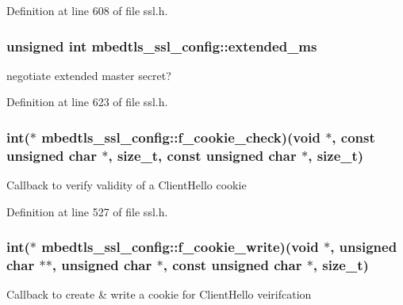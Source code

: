 Definition at line 608 of file ssl.\-h.

\hypertarget{structmbedtls__ssl__config_ac6ac2c30ac20fc9033913e0de6ffbe93}{
\subsubsection[{extended\-\_\-ms}]{\setlength{\rightskip}{0pt plus 5cm}unsigned int mbedtls\-\_\-ssl\-\_\-config\-::extended\-\_\-ms}}\label{structmbedtls__ssl__config_ac6ac2c30ac20fc9033913e0de6ffbe93}
negotiate extended master secret? 

Definition at line 623 of file ssl.\-h.

\hypertarget{structmbedtls__ssl__config_a2a992d43e5f3215b07533dd6cacf5de4}{
\subsubsection[{f\-\_\-cookie\-\_\-check}]{\setlength{\rightskip}{0pt plus 5cm}int($\ast$ mbedtls\-\_\-ssl\-\_\-config\-::f\-\_\-cookie\-\_\-check)(void $\ast$, const unsigned char $\ast$, size\-\_\-t, const unsigned char $\ast$, size\-\_\-t)}}\label{structmbedtls__ssl__config_a2a992d43e5f3215b07533dd6cacf5de4}
Callback to verify validity of a Client\-Hello cookie 

Definition at line 527 of file ssl.\-h.

\hypertarget{structmbedtls__ssl__config_a24ad512d14251faef692f9692acab21c}{
\subsubsection[{f\-\_\-cookie\-\_\-write}]{\setlength{\rightskip}{0pt plus 5cm}int($\ast$ mbedtls\-\_\-ssl\-\_\-config\-::f\-\_\-cookie\-\_\-write)(void $\ast$, unsigned char $\ast$$\ast$, unsigned char $\ast$, const unsigned char $\ast$, size\-\_\-t)}}\label{structmbedtls__ssl__config_a24ad512d14251faef692f9692acab21c}
Callback to create \& write a cookie for Client\-Hello veirifcation 

